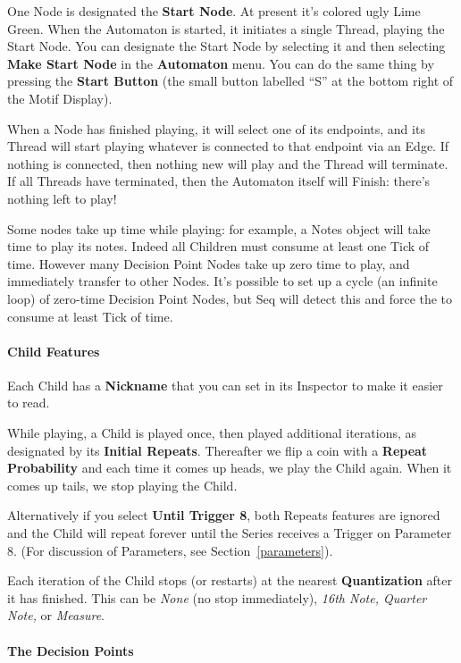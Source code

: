 \documentclass[twoside,10pt]{article}
\begin{document}
One Node is designated the {\bf Start Node}.  At present it's colored ugly Lime Green.  When the Automaton is started, it initiates a single Thread, playing the Start Node.  You can designate the Start Node by selecting it and then selecting {\bf Make Start Node} in the {\bf Automaton} menu.  You can do the same thing by pressing the {\bf Start Button} (the small button labelled ``S'' at the bottom right of the Motif Display).

When a Node has finished playing, it will select one of its endpoints, and its Thread will start playing whatever is connected to that endpoint via an Edge.  If nothing is connected, then nothing new will play and the Thread will terminate.  If all Threads have terminated, then the Automaton itself will Finish: there's nothing left to play!

Some nodes take up time while playing: for example, a Notes object will take time to play its notes.  Indeed all Children must consume at least one Tick of time.  However many Decision Point Nodes take up zero time to play, and immediately transfer to other Nodes.  It's possible to set up a cycle (an infinite loop) of zero-time Decision Point Nodes, but Seq will detect this and force the to consume at least Tick of time.

\paragraph{Child Features}

Each Child has a {\bf Nickname} that you can set in its Inspector to make it easier to read.

While playing, a Child is played once, then played additional iterations, as designated by its {\bf Initial Repeats}.  Thereafter we flip a coin with a {\bf Repeat Probability} and each time it comes up heads, we play the Child again.  When it comes up tails, we stop playing the Child.

Alternatively if you select {\bf Until Trigger 8}, both Repeats features are ignored and the Child  will repeat forever until the Series receives a Trigger on Parameter 8.  (For discussion of Parameters, see Section~\ref{parameters}).

Each iteration of the Child stops (or restarts) at the nearest {\bf Quantization} after it has finished.  This can be {\it None} (no stop immediately), {\it 16th Note, Quarter Note,} or {\it Measure}.



\paragraph{The Decision Points}
\end{document}
